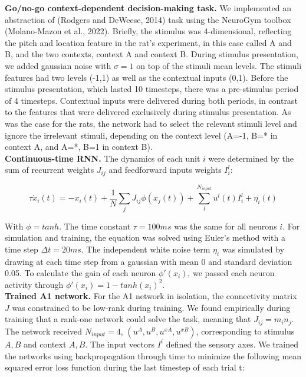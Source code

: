 \documentclass[12pt]{article}
\begin{document}
\textbf{Go/no-go context-dependent decision-making task.} We implemented an abstraction of (Rodgers and DeWeese, 2014) task using the NeuroGym toolbox (Molano-Mazon et al., 2022). Briefly, the stimulus was 4-dimensional, reflecting the pitch and location feature in the rat’s experiment, in this case called A and B, and the two contexts, context A and context B. During stimulus presentation, we added gaussian noise with $\sigma = 1$ on top of the stimuli mean levels. The stimuli features had two levels (-1,1) as well as the contextual inputs (0,1). Before the stimulus presentation, which lasted 10 timesteps, there was a pre-stimulus period of 4 timesteps. Contextual inputs were delivered during both periods, in contrast to the features that were delivered exclusively during stimulus presentation. As was the case for the rats, the network had to select the relevant stimuli level and ignore the irrelevant stimuli, depending on the context level (A=-1, B=* in context A, and A=*, B=1 in context B). \\

\textbf{Continuous-time RNN.} The dynamics of each unit $i$ were determined by the sum of recurrent weights $J_{ij}$ and feedforward inputs weights $I_i^l$:

$$ \tau \dot x_i(t) = -x_i(t) + \frac{1}{N}\sum_jJ_{ij}\phi(x_j(t)) + \sum_l^{N_{input}}u^l(t)I^l_i + \eta_i (t)$$

With $\phi = tanh$. The time constant $\tau = 100 ms$ was the same for all neurons $i$. For simulation and training, the equation was solved using Euler’s method with a time step $\Delta t = 20 ms$. The independent white noise term $\eta_i$ was simulated by drawing at each time step from a gaussian with mean 0 and standard deviation 0.05. To calculate the gain of each neuron $\phi'(x_i)$, we passed each neuron activity through $\phi'(x_i) = 1 - tanh(x_i)^2 $. \\


\textbf{Trained  A1 network.} For the A1 network in isolation, the connectivity matrix $J$ was constrained to be low-rank during training. We found empirically during training that a rank-one network could solve the task, meaning that $J_{ij} = m_i n_j $. The network received $ N_{input} = 4$, $ (u^A, u^B, u^{xA}, u^{xB})$, corresponding to stimulus $A,B$ and context $A,B$. The input vectors $I^i$ defined the sensory axes. We trained the networks using backpropagation through time to minimize the following mean squared error loss function during the last timestep of each trial t:
\end{document}
